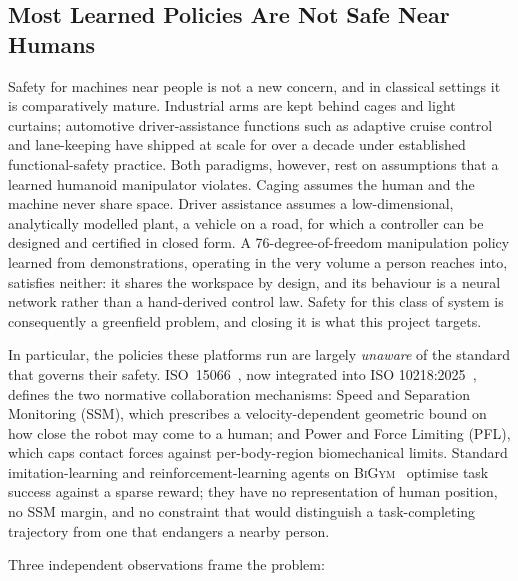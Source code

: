 \documentclass[11pt,a4paper]{report}
\newcommand{\ssm}{SSM}
\newcommand{\pfl}{PFL}
\newcommand{\iso}{ISO~15066}
\newcommand{\bigym}{\textsc{BiGym}}
\begin{document}
\subsection{Most Learned Policies Are Not Safe Near Humans}
\label{sec:intro:mot:unsafe}

Safety for machines near people is not a new concern, and in classical
settings it is comparatively mature. Industrial arms are kept behind
cages and light curtains; automotive driver-assistance functions such
as adaptive cruise control and lane-keeping have shipped at scale for
over a decade under established functional-safety practice. Both
paradigms, however, rest on assumptions that a learned humanoid
manipulator violates. Caging assumes the human and the machine never
share space. Driver assistance assumes a low-dimensional, analytically
modelled plant, a vehicle on a road, for which a controller can be
designed and certified in closed form. A 76-degree-of-freedom
manipulation policy learned from demonstrations, operating in the very
volume a person reaches into, satisfies neither: it shares the
workspace by design, and its behaviour is a neural network rather than
a hand-derived control law. Safety for this class of system is
consequently a greenfield problem, and closing it is what this project
targets.

In particular, the policies these platforms run are largely
\emph{unaware} of the standard that governs their safety. \iso{}~\cite{iso15066}, now
integrated into ISO 10218:2025~\cite{iso10218}, defines the two
normative collaboration mechanisms: Speed and Separation Monitoring
(\ssm{}), which prescribes a velocity-dependent geometric bound on
how close the robot may come to a human; and Power and Force
Limiting (\pfl{}), which caps contact forces against per-body-region
biomechanical limits. Standard imitation-learning and
reinforcement-learning agents on
\bigym{}~\cite{chernyadev2024bigym} optimise task success against a
sparse reward; they have no representation of human position, no
\ssm{} margin, and no constraint that would distinguish a
task-completing trajectory from one that endangers a nearby person.

Three independent observations frame the problem:
\end{document}
